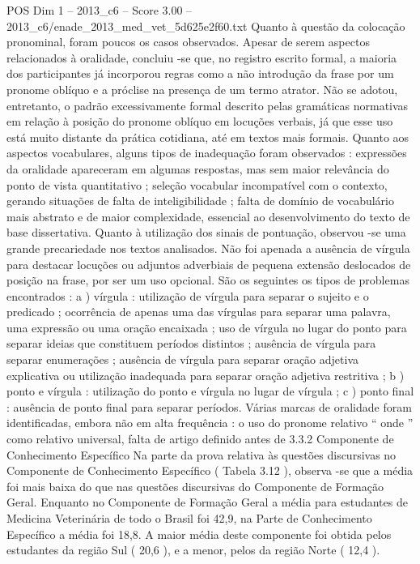 \begin{textsample}{POS Dim 1 – 2013\_c6 – Score 3.00 – 2013\_c6/enade\_2013\_med\_vet\_5d625e2f60.txt}
Quanto à questão da colocação pronominal, foram poucos os casos observados.
Apesar de serem aspectos relacionados à oralidade, concluiu -se que, no registro escrito formal, a maioria dos participantes já incorporou regras como a não introdução da frase por um pronome oblíquo e a próclise na presença de um termo atrator.
Não se adotou, entretanto, o padrão excessivamente formal descrito pelas gramáticas normativas em relação à posição do pronome oblíquo em locuções verbais, já que esse uso está muito distante da prática cotidiana, até em textos mais formais.
Quanto aos aspectos vocabulares, alguns tipos de inadequação foram observados : expressões da oralidade apareceram em algumas respostas, mas sem maior relevância do ponto de vista quantitativo ; seleção vocabular incompatível com o contexto, gerando situações de falta de inteligibilidade ; falta de domínio de vocabulário mais abstrato e de maior complexidade, essencial ao desenvolvimento do texto de base dissertativa.
Quanto à utilização dos sinais de pontuação, observou -se uma grande precariedade nos textos analisados.
Não foi apenada a ausência de vírgula para destacar locuções ou adjuntos adverbiais de pequena extensão deslocados de posição na frase, por ser um uso opcional.
São os seguintes os tipos de problemas encontrados : a ) vírgula : utilização de vírgula para separar o sujeito e o predicado ; ocorrência de apenas uma das vírgulas para separar uma palavra, uma expressão ou uma oração encaixada ; uso de vírgula no lugar do ponto para separar ideias que constituem períodos distintos ; ausência de vírgula para separar enumerações ; ausência de vírgula para separar oração adjetiva explicativa ou utilização inadequada para separar oração adjetiva restritiva ; b ) ponto e vírgula : utilização do ponto e vírgula no lugar de vírgula ; c ) ponto final : ausência de ponto final para separar períodos.
Várias marcas de oralidade foram identificadas, embora não em alta frequência : o uso do pronome relativo “ onde ” como relativo universal, falta de artigo definido antes de 3.3.2 Componente de Conhecimento Específico Na parte da prova relativa às questões discursivas no Componente de Conhecimento Específico ( Tabela 3.12 ), observa -se que a média foi mais baixa do que nas questões discursivas do Componente de Formação Geral.
Enquanto no Componente de Formação Geral a média para estudantes de Medicina Veterinária de todo o Brasil foi 42,9, na Parte de Conhecimento Específico a média foi 18,8.
A maior média deste componente foi obtida pelos estudantes da região Sul ( 20,6 ), e a menor, pelos da região Norte ( 12,4 ).

\end{textsample}
